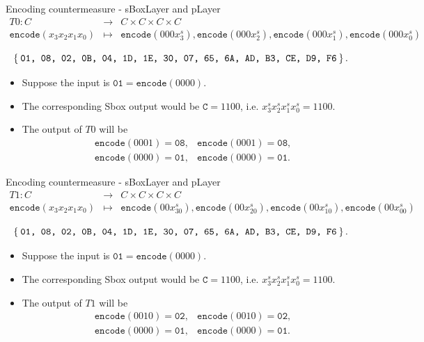 \begin{frame}{Encoding countermeasure - sBoxLayer and pLayer}
\begin{eqnarray*}
T0:C &\to& C\times C\times C\times C\\
\texttt{encode}(x_3x_2x_1x_0) &\mapsto& \texttt{encode}(000x^s_3),\texttt{encode}(000x^s_2),\texttt{encode}(000x^s_1),\texttt{encode}(000x^s_0)
\end{eqnarray*}
    \begin{example}
    \begin{equation*}
    \Set{\texttt{01, 08, 02, 0B, 04, 1D, 1E, 30, 07, 65, 6A, AD, B3, CE, D9, F6}}.
\end{equation*}
\begin{itemize}
    \item Suppose the input is $\texttt{01}=\texttt{encode}(0000)$.
    \item The corresponding Sbox output would be $\texttt{C}=1100$, i.e. $x^s_3x^s_2x^s_1x^s_0=1100$.
    \item  The output of $T0$ will be 
     \begin{eqnarray*}
    &\texttt{encode}(0001)=\texttt{08}, 
    &\texttt{encode}(0001)=\texttt{08},\\
    &\texttt{encode}(0000)=\texttt{01},
    &\texttt{encode}(0000)=\texttt{01}.
     \end{eqnarray*}
\end{itemize}
\end{example}
\end{frame}


\begin{frame}{Encoding countermeasure - sBoxLayer and pLayer}
\begin{eqnarray*}
T1:C &\to& C\times C\times C\times C\\
\texttt{encode}(x_3x_2x_1x_0) &\mapsto& \texttt{encode}(00x^s_30),\texttt{encode}(00x^s_20),\texttt{encode}(00x^s_10),\texttt{encode}(00x^s_00)
\end{eqnarray*}
    \begin{example}
    \begin{equation*}
    \Set{\texttt{01, 08, 02, 0B, 04, 1D, 1E, 30, 07, 65, 6A, AD, B3, CE, D9, F6}}.
\end{equation*}
\begin{itemize}
    \item Suppose the input is $\texttt{01}=\texttt{encode}(0000)$.
    \item The corresponding Sbox output would be $\texttt{C}=1100$, i.e. $x^s_3x^s_2x^s_1x^s_0=1100$.
    \item  The output of $T1$ will be
    \begin{eqnarray*}
    &\texttt{encode}(0010)=\texttt{02}, 
    &\texttt{encode}(0010)=\texttt{02},\\ 
    &\texttt{encode}(0000)=\texttt{01},
    &\texttt{encode}(0000)=\texttt{01}.
    \end{eqnarray*}
\end{itemize}
\end{example}
\end{frame}

